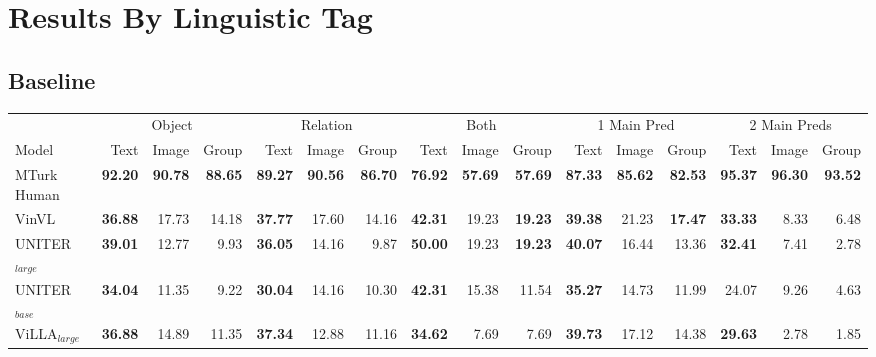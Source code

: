 \section{Results By Linguistic Tag}

\subsection{Baseline}

\begin{table*}[!ht]
    \centering
    \begin{adjustbox}{max width=\textwidth}
  \begin{tabular}{l|rrr|rrr|rrr|rrr|rrr}
    \toprule
     &
      \multicolumn{3}{c|}{Object} &
      \multicolumn{3}{c|}{Relation} &
      \multicolumn{3}{c|}{Both} &
      \multicolumn{3}{c|}{1 Main Pred} &
      \multicolumn{3}{c}{2 Main Preds}\\
    Model & Text & Image & Group & Text & Image & Group & Text & Image & Group & Text & Image & Group & Text & Image & Group \\\midrule
 MTurk Human                  & \textbf{92.20} & \textbf{90.78} & \textbf{88.65} & \textbf{89.27} & \textbf{90.56} & \textbf{86.70} & \textbf{76.92} & \textbf{57.69} & \textbf{57.69} & \textbf{87.33} & \textbf{85.62} & \textbf{82.53} & \textbf{95.37} & \textbf{96.30} & \textbf{93.52} \\
 VinVL                        & \textbf{36.88} & 17.73          & 14.18          & \textbf{37.77} & 17.60          & 14.16          & \textbf{42.31} & 19.23          & \textbf{19.23} & \textbf{39.38} & 21.23          & \textbf{17.47} & \textbf{33.33} & 8.33           & 6.48           \\
 UNITER$_{large}$             & \textbf{39.01} & 12.77          & 9.93           & \textbf{36.05} & 14.16          & 9.87           & \textbf{50.00} & 19.23          & \textbf{19.23} & \textbf{40.07} & 16.44          & 13.36          & \textbf{32.41} & 7.41           & 2.78           \\
 UNITER$_{base}$              & \textbf{34.04} & 11.35          & 9.22           & \textbf{30.04} & 14.16          & 10.30          & \textbf{42.31} & 15.38          & 11.54          & \textbf{35.27} & 14.73          & 11.99          & 24.07          & 9.26           & 4.63           \\
 ViLLA$_{large}$              & \textbf{36.88} & 14.89          & 11.35          & \textbf{37.34} & 12.88          & 11.16          & \textbf{34.62} & 7.69           & 7.69           & \textbf{39.73} & 17.12          & 14.38          & \textbf{29.63} & 2.78           & 1.85           \\

\end{tabular}
\end{adjustbox}
\end{table*}
